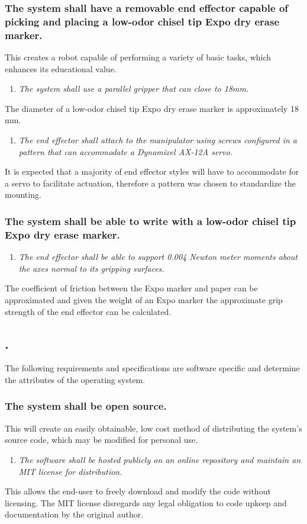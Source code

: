 \documentclass[12pt]{report}
\newcommand{\hiddensubsection}[1]{
  \stepcounter{subsection}
  \subsection*{\arabic{section}.\arabic{subsection}\hspace{1em}{#1}}
}
\begin{document}
\subsubsection{The system shall have a removable end effector capable of picking and placing a low-odor chisel tip Expo dry erase marker.}
This creates a robot capable of performing a variety of basic tasks, which enhances its educational value.
\begin{enumerate}
  \item \textit{The system shall use a parallel gripper that can close to 18mm.}
\end{enumerate}
The diameter of a low-odor chisel tip Expo dry erase marker is approximately 18 mm.
\begin{enumerate}[resume]
  \item \textit{The end effector shall attach to the manipulator using screws configured in a pattern that can accommodate a Dynamixel AX-12A servo.}
\end{enumerate}
It is expected that a majority of end effector styles will have to accommodate for a servo to facilitate actuation, therefore a pattern was chosen to standardize the mounting.


\subsubsection{The system shall be able to write with a low-odor chisel tip Expo dry erase marker.}
\begin{enumerate}
  \item \textit{The end effector shall be able to support 0.004 Newton meter moments about the axes normal to its gripping surfaces.}
\end{enumerate}
  The coefficient of friction between the Expo marker and paper can be approximated and given the weight of an Expo marker the approximate grip strength of the end effector can be calculated.
\hiddensubsection{Software}
The following requirements and specifications are software specific and determine the attributes of the operating system.
\subsubsection{The system shall be open source.}
This will create an easily obtainable, low cost method of distributing the system’s source code, which may be modified for personal use.
\begin{enumerate}
  \item \textit{The software shall be hosted publicly on an online repository and maintain an MIT license for distribution.}
\end{enumerate}
  This allows the end-user to freely download and modify the code without licensing. The MIT license disregards any legal obligation to code upkeep and documentation by the original author.
\end{document}
